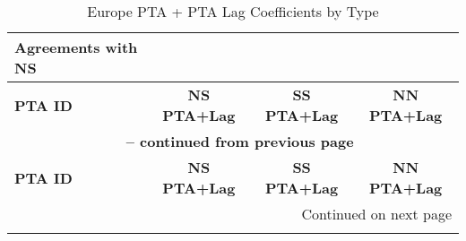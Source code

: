 \begin{center}
\small
\begin{longtable}{lccc}
    \caption{Europe PTA + PTA Lag Coefficients by Type} \label{tab:europe_pta} \\

    \hline
    \textbf{Agreements with NS} &  &  &  \\
    \hline
    \textbf{PTA ID} & \textbf{NS PTA+Lag} & \textbf{SS PTA+Lag} & \textbf{NN PTA+Lag} \\
    \hline
    \endfirsthead
    
    \multicolumn{4}{c}{{\bfseries \tablename\ \thetable{} -- continued from previous page}} \\
    \hline
    \textbf{PTA ID} & \textbf{NS PTA+Lag} & \textbf{SS PTA+Lag} & \textbf{NN PTA+Lag} \\
    \hline
    \endhead
    
    \hline \multicolumn{4}{r}{{Continued on next page}} \\ \hline
    \endfoot
    
    \hline
    \endlastfoot
    

\end{longtable}
\end{center}
